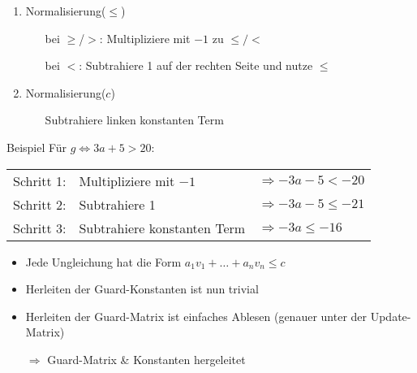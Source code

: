 \begin{frame}
	\begin{enumerate}
		\item Normalisierung($\le$)
			\begin{itemize}
				\setlength{\itemindent}{.5in}
				\item[bei $\ge$/$>$:] Multipliziere mit $-1$ zu $\le/<$ 
				\item[bei $<$:] Subtrahiere 1 auf der rechten Seite und nutze $\le$
			\end{itemize}
		\item Normalisierung($c$)
			\begin{itemize}
				\setlength{\itemindent}{.5in}
				\item[] Subtrahiere linken konstanten Term  
			\end{itemize}
	\end{enumerate}
	\begin{exampleblock}{Beispiel}
		F\"ur $g \Leftrightarrow 3a+5>20$:
		\begin{tabular}{cll}
			Schritt 1: & Multipliziere mit $-1$ & $\Rightarrow -3a-5 < -20$ \\
			Schritt 2: & Subtrahiere 1 & $\Rightarrow -3a-5\le -21$ \\
			Schritt 3: & Subtrahiere konstanten Term & $\Rightarrow -3a \le -16$ \\
		\end{tabular}
	\end{exampleblock}
\end{frame}


\begin{frame} %
	\begin{itemize}
		\item Jede Ungleichung hat die Form $a_1 v_1 + \dots + a_n v_n \le c$
		\item Herleiten der Guard-Konstanten ist nun trivial
		\item Herleiten der Guard-Matrix ist einfaches Ablesen
		\hspace*{1.5cm}(genauer unter der Update-Matrix)
		\item[$\Rightarrow$] Guard-Matrix \& Konstanten hergeleitet \checkmark
	\end{itemize}
\end{frame}

